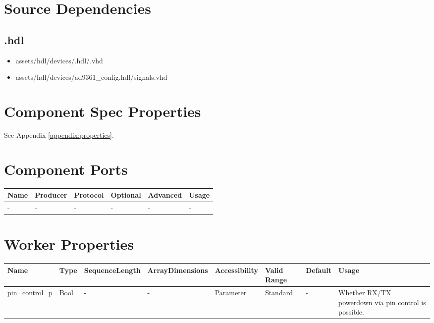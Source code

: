 \section{Source Dependencies}
\subsection{\comp.hdl}
\begin{itemize}
  \item assets/hdl/devices/\comp.hdl/\comp.vhd
  \item assets/hdl/devices/ad9361\_config.hdl/signals.vhd
\end{itemize}
\begin{landscape}
  \section{Component Spec Properties}
  See Appendix \ref{appendix:properties}.

  \section{Component Ports}
  \begin{scriptsize}
    \begin{tabular}{|p{2cm}|p{1.5cm}|p{4cm}|p{1.5cm}|p{1.5cm}|p{11.29cm}|}
      \hline
      \rowcolor{blue}
      Name & Producer & Protocol           & Optional & Advanced & Usage                  \\
      \hline
      -    & -        & -                  & -        & -        & - \\
      \hline
    \end{tabular}
  \end{scriptsize}

  \section{Worker Properties}
  \begin{scriptsize}
    \begin{tabular}{|p{3.75cm}|p{1.25cm}|p{2cm}|p{2.75cm}|p{1.5cm}|p{1.5cm}|p{1cm}|p{7.17cm}|}
      \hline
      \rowcolor{blue}
      Name               & Type & SequenceLength & ArrayDimensions & Accessibility      & Valid Range & Default & Usage                                                                               \\
      \hline
      pin\_control\_p & Bool & - & - & Parameter & Standard & - & Whether RX/TX powerdown via pin control is possible. \\
      \hline
    \end{tabular}
  \end{scriptsize}


\end{landscape}
